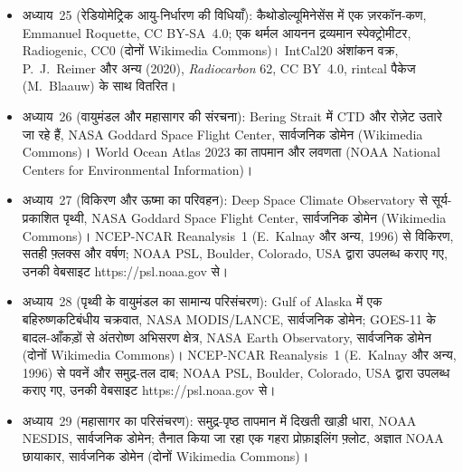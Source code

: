 \begin{itemize}
  \item अध्याय~25 (रेडियोमेट्रिक आयु-निर्धारण की विधियाँ): कैथोडोल्यूमिनेसेंस में एक ज़रकॉन-कण, Emmanuel Roquette, CC BY-SA~4.0; एक थर्मल आयनन द्रव्यमान स्पेक्ट्रोमीटर, Radiogenic, CC0 (दोनों Wikimedia Commons)। IntCal20 अंशांकन वक्र, P.~J.~Reimer और अन्य (2020), \emph{Radiocarbon} 62, CC BY~4.0, rintcal पैकेज (M.~Blaauw) के साथ वितरित।
  \item अध्याय~26 (वायुमंडल और महासागर की संरचना): Bering Strait में CTD और रोज़ेट उतारे जा रहे हैं, NASA Goddard Space Flight Center, सार्वजनिक डोमेन (Wikimedia Commons)। World Ocean Atlas 2023 का तापमान और लवणता (NOAA National Centers for Environmental Information)।
  \item अध्याय~27 (विकिरण और ऊष्मा का परिवहन): Deep Space Climate Observatory से सूर्य-प्रकाशित पृथ्वी, NASA Goddard Space Flight Center, सार्वजनिक डोमेन (Wikimedia Commons)। NCEP-NCAR Reanalysis~1 (E.~Kalnay और अन्य, 1996) से विकिरण, सतही फ़्लक्स और वर्षण; NOAA PSL, Boulder, Colorado, USA द्वारा उपलब्ध कराए गए, उनकी वेबसाइट https://psl.noaa.gov से।
  \item अध्याय~28 (पृथ्वी के वायुमंडल का सामान्य परिसंचरण): Gulf of Alaska में एक बहिरुष्णकटिबंधीय चक्रवात, NASA MODIS/LANCE, सार्वजनिक डोमेन; GOES-11 के बादल-आँकड़ों से अंतरोष्ण अभिसरण क्षेत्र, NASA Earth Observatory, सार्वजनिक डोमेन (दोनों Wikimedia Commons)। NCEP-NCAR Reanalysis~1 (E.~Kalnay और अन्य, 1996) से पवनें और समुद्र-तल दाब; NOAA PSL, Boulder, Colorado, USA द्वारा उपलब्ध कराए गए, उनकी वेबसाइट https://psl.noaa.gov से।
  \item अध्याय~29 (महासागर का परिसंचरण): समुद्र-पृष्ठ तापमान में दिखती खाड़ी धारा, NOAA NESDIS, सार्वजनिक डोमेन; तैनात किया जा रहा एक गहरा प्रोफ़ाइलिंग फ़्लोट, अज्ञात NOAA छायाकार, सार्वजनिक डोमेन (दोनों Wikimedia Commons)।
\end{itemize}
